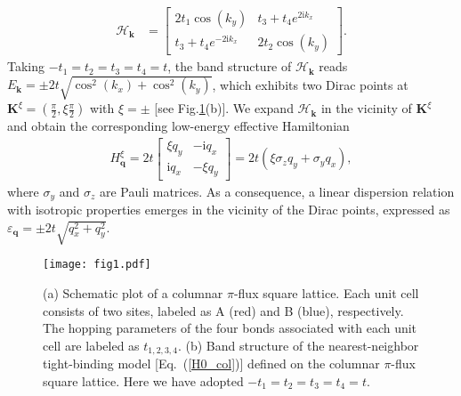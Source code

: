 \documentclass[aps, twocolumn, floatfix, superscriptaddress, prb]{revtex4-1}
\begin{document}
%
\begin{align}\label{H0k_col}
\mathcal{H}_{\bm k} &=\left\lbrack \begin{array}{cc}
2t_1 \cos \left(k_y \right) & t_3 +t_4 e^{2\mathrm{i}k_x } \\
t_3 +t_4 e^{-2\mathrm{i}k_x }  & {2t}_2 \cos \left(k_y \right)
\end{array}\right\rbrack.
\end{align}
%
Taking $-t_1=t_2=t_3=t_4=t$, the band structure of $\mathcal{H}_{\bm k}$ reads $E_{\bm k}=\pm2t\sqrt{\cos^2(k_x)+\cos^2(k_y)}$, which exhibits two Dirac points at ${\bm K}^\xi=\left(\frac{\pi}2, \xi\frac{\pi}2\right)$ with $\xi=\pm$ [see Fig.\ref{fig1}(b)]. We expand $\mathcal{H}_{\bm k}$ in the vicinity of ${\bm K}^\xi$ and obtain the corresponding low-energy effective Hamiltonian
%
\begin{align}\label{H0q_col}
  H_{\bm q}^\xi=2t\left\lbrack \begin{array}{cc}
\xi q_y  & -{\textrm{i}}q_x \\
{\textrm{i}}q_x  & -\xi q_y
\end{array}\right\rbrack =2t\left(\xi\sigma_z q_y+\sigma_y q_x\right),
\end{align}
%
where $\sigma_y$ and $\sigma_z$ are Pauli matrices.
As a consequence, a linear dispersion relation with isotropic properties emerges in the vicinity of the Dirac points, expressed as $\varepsilon_{\bm q}=\pm2t\sqrt{q_x^2+q_y^2}$.

%
\begin{figure}[t]
\centering
\texttt{[image: fig1.pdf]}
\caption{(a) Schematic plot of a columnar $\pi$-flux square lattice. Each unit cell consists of two sites, labeled as A (red) and B (blue), respectively. The hopping parameters of the four bonds associated with each unit cell are labeled as $t_{1,2,3,4}$. (b) Band structure of the nearest-neighbor tight-binding model [Eq.~(\ref{H0_col})] defined on the columnar $\pi$-flux square lattice. Here we have adopted $-t_1=t_2=t_3=t_4=t$.
}\label{fig1}
\end{figure}
%
\end{document}
